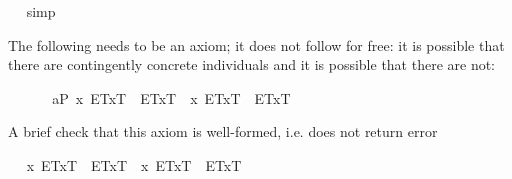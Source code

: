 \begin{isabellebody}
\isadelimproof
\ %
\endisadelimproof
%
\isatagproof
{}\isamarkupfalse%
\ simp\ \isamarkupfalse%
%
\endisatagproof
{\isafoldproof}%
%
\isadelimproof
%
\endisadelimproof
%
\begin{isamarkuptext}%
The following needs to be an axiom; it does not follow for free: it is possible that there 
  are contingently concrete individuals and it is possible that there are not:%
\end{isamarkuptext}%
\isamarkuptrue%
\ \isamarkupfalse%
\ \isanewline
\ \ \ a{}{}{\isacharunderscore}{}{\isacharunderscore}P{\isacharcolon}\ {\isachardoublequoteopen}{\isacharbrackleft}\isactrlbold {\isasymdiamond}{\isacharparenleft}\isactrlbold {\isasymexists}x{\isachardot}\ {\isasymlparr}E\isactrlsup T{\isacharcomma}x\isactrlsup T{\isasymrparr}\ \isactrlbold {\isasymand}\ \isactrlbold {\isasymdiamond}{\isacharparenleft}\isactrlbold {\isasymnot}{\isasymlparr}E\isactrlsup T{\isacharcomma}x\isactrlsup T{\isasymrparr}{\isacharparenright}{\isacharparenright}\ \isactrlbold {\isasymand}\ \isactrlbold {\isasymdiamond}{\isacharparenleft}\isactrlbold {\isasymnot}{\isacharparenleft}\isactrlbold {\isasymexists}x{\isachardot}\ {\isasymlparr}E\isactrlsup T{\isacharcomma}x\isactrlsup T{\isasymrparr}\ \isactrlbold {\isasymand}\ \isactrlbold {\isasymdiamond}{\isacharparenleft}\isactrlbold {\isasymnot}{\isasymlparr}E\isactrlsup T{\isacharcomma}x\isactrlsup T{\isasymrparr}{\isacharparenright}{\isacharparenright}{\isacharparenright}{\isacharbrackright}\ {\isacharequal}\ {\isasymtop}{\isachardoublequoteclose}%
\begin{isamarkuptext}%
A brief check that this axiom is well-formed, i.e. does not return error%
\end{isamarkuptext}%
\isamarkuptrue%
\ \isamarkupfalse%
\ {\isachardoublequoteopen}{\isacharbrackleft}\isactrlbold {\isasymdiamond}{\isacharparenleft}\isactrlbold {\isasymexists}x{\isachardot}\ {\isasymlparr}E\isactrlsup T{\isacharcomma}x\isactrlsup T{\isasymrparr}\ \isactrlbold {\isasymand}\ \isactrlbold {\isasymdiamond}{\isacharparenleft}\isactrlbold {\isasymnot}{\isasymlparr}E\isactrlsup T{\isacharcomma}x\isactrlsup T{\isasymrparr}{\isacharparenright}{\isacharparenright}\ \isactrlbold {\isasymand}\ \isactrlbold {\isasymdiamond}{\isacharparenleft}\isactrlbold {\isasymnot}{\isacharparenleft}\isactrlbold {\isasymexists}x{\isachardot}\ {\isasymlparr}E\isactrlsup T{\isacharcomma}x\isactrlsup T{\isasymrparr}\ \isactrlbold {\isasymand}\ \isactrlbold {\isasymdiamond}{\isacharparenleft}\isactrlbold {\isasymnot}{\isasymlparr}E\isactrlsup T{\isacharcomma}x\isactrlsup T{\isasymrparr}{\isacharparenright}{\isacharparenright}{\isacharparenright}{\isacharbrackright}\ {\isasymnoteq}\ {\isacharasterisk}{\isachardoublequoteclose}%

\end{isabellebody}
